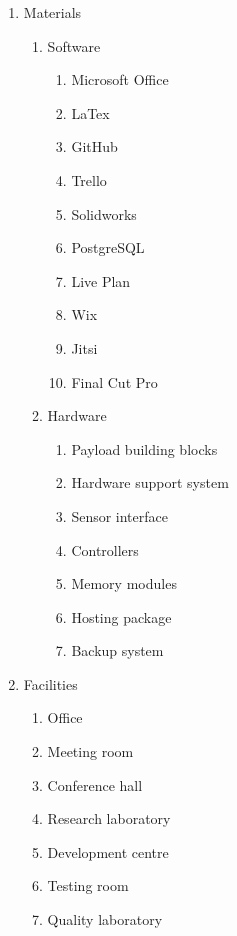 \begin{enumerate}[label*=\arabic*.]
	\item Materials
		\begin{enumerate}[label*=\arabic*.]
			\item Software
			\begin{enumerate}[label*=\arabic*.]
				\item Microsoft Office
				\item LaTex
				\item GitHub
				\item Trello
				\item Solidworks
				\item PostgreSQL
				\item Live Plan
				\item Wix
				\item Jitsi
				\item Final Cut Pro
			\end{enumerate}
			\item Hardware
			\begin{enumerate}[label*=\arabic*.]
				\item Payload building blocks
				\item Hardware support system
				\item Sensor interface
				\item Controllers
				\item Memory modules
				\item Hosting package
				\item Backup system
			\end{enumerate}
		\end{enumerate}
	
	\item Facilities
		\begin{enumerate}[label*=\arabic*.]
		\item Office
		\item Meeting room
		\item Conference hall
		\item Research laboratory
		\item Development centre
		\item Testing room
		\item Quality laboratory
		\end{enumerate}
	
\end{enumerate}